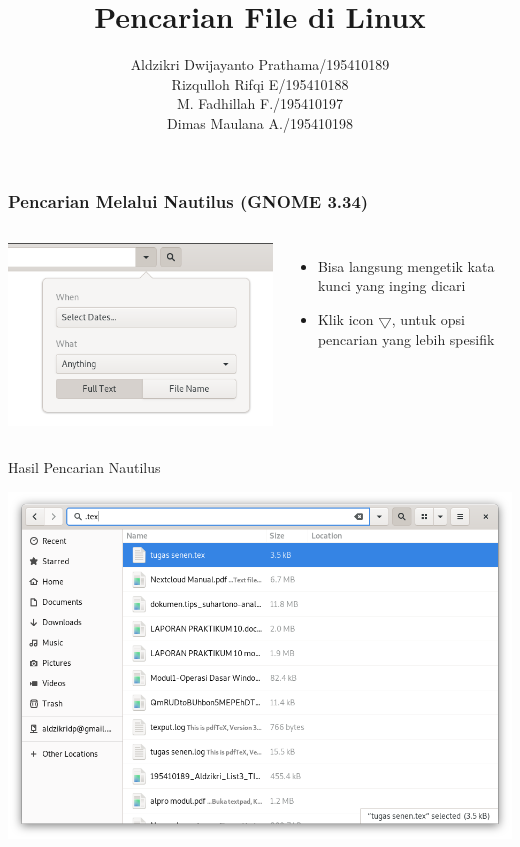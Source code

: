 \documentclass{beamer}
\title{Pencarian File di Linux}
\author{Aldzikri Dwijayanto Prathama/195410189\\
		Rizqulloh Rifqi E/195410188\\
	M. Fadhillah F./195410197\\
Dimas Maulana A./195410198}
\begin{document}
\maketitle

\begin{frame}
    \frametitle{Pencarian Melalui Nautilus (GNOME 3.34)}
    \begin{columns}
        \includegraphics[width=\linewidth]{img1}
        
        \begin{itemize}
        	\item Bisa langsung mengetik kata kunci yang inging dicari
        	\item Klik icon $\bigtriangledown$,  untuk opsi pencarian yang  lebih spesifik
        \end{itemize}
    \end{columns}
\end{frame}

\begin{frame}{Hasil Pencarian Nautilus}
	\begin{center}
		\includegraphics[scale=.3]{img3}
	\end{center}
\end{frame}
\end{document}
